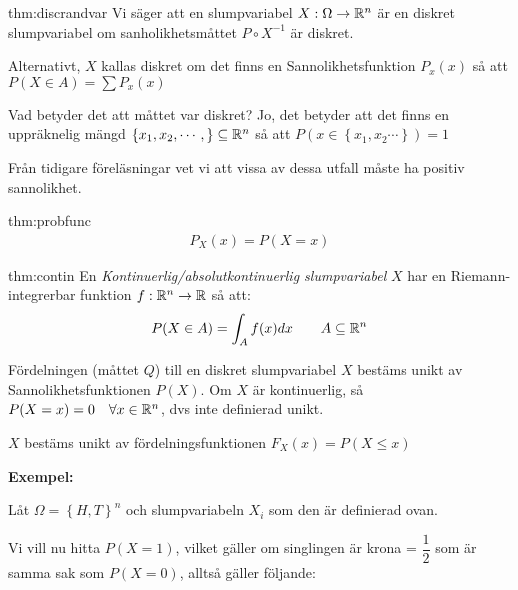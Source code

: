 \par\bigskip
\begin{theo}{thm:discrandvar}
  Vi säger att en slumpvariabel $X:\Omega\to\mathbb{R}^n$ är en diskret slumpvariabel om sanholikhetsmåttet $P\circ X^{-1}$ är diskret.
  \par\bigskip
  \noindent Alternativt, $X$ kallas diskret om det finns en Sannolikhetsfunktion $P_x(x)$ så att $P(X\in A) = \sum P_x(x)$
\end{theo}
\par\bigskip
\noindent Vad betyder det att måttet var diskret? Jo, det betyder att det finns en uppräknelig mängd $\left\{x_1,x_2,\cdots,\right\}\subseteq\mathbb{R}^n$ så att $P(x\in\left\{x_1,x_2\cdots\right\})=1$\par
\noindent Från tidigare föreläsningar vet vi att vissa av dessa utfall måste ha positiv sannolikhet.
\par\bigskip
\begin{theo}[Sannolikhetsfunktionen]{thm:probfunc}
  \begin{equation*}
    \begin{gathered}
      P_X(x) = P(X=x)
    \end{gathered}
  \end{equation*}
\end{theo}
\newpage
\begin{theo}{thm:contin}
  En \textit{Kontinuerlig/absolutkontinuerlig slumpvariabel} $X$ har en Riemann-integrerbar funktion $f:\mathbb{R}^n\to\mathbb{R}$ så att:
  \begin{equation*}
    \begin{gathered}
      P(X\in A) = \int_{A}f(x)dx\qquad A\subseteq \mathbb{R}^n
    \end{gathered}
  \end{equation*}
\end{theo}
\par\bigskip
\noindent Fördelningen (måttet $Q$) till en diskret slumpvariabel $X$ bestäms unikt av Sannolikhetsfunktionen $P(X)$. Om $X$ är kontinuerlig, så $P(X=x)=0\quad\forall x\in\mathbb{R}^n$, dvs inte definierad unikt.\par
\noindent $X$ bestäms unikt av fördelningsfunktionen $F_X(x)=P(X\leq x)$
\par\bigskip
\noindent\textbf{Exempel:}\par
\noindent Låt $\Omega = \left\{H,T\right\}^n$ och slumpvariabeln $X_i$ som den är definierad ovan.\par
\noindent Vi vill nu hitta $P(X=1)$, vilket gäller om singlingen är krona = $\dfrac{1}{2}$ som är samma sak som $P(X=0)$, alltså gäller följande:

